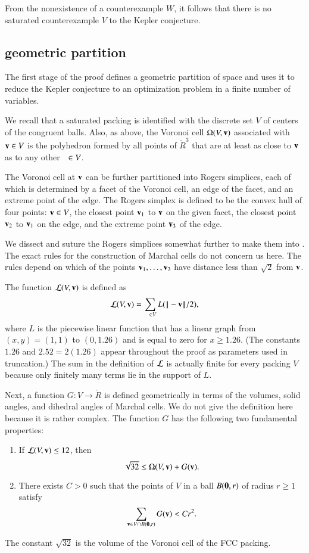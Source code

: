 From the nonexistence of a counterexample $W$, 
it follows that there is no saturated
counterexample $V$ to the Kepler conjecture.



\subsection{geometric partition}

The first stage of the proof defines a geometric partition of space
and uses it to reduce the Kepler conjecture to an optimization problem
in a finite number of variables.

We recall that a saturated packing is
identified with the discrete set $V$ of centers of the
congruent balls.  Also, as above, the Voronoi cell $\Omega(V,{\mathbf v})$
associated with ${\mathbf v}\in V$ is the polyhedron formed by all points of
$\ring{R}^3$ that are at least as close to ${\mathbf v}$ as to any other $\hskip0.65em\in
V$.   

The Voronoi cell at ${\mathbf v}$ can be further partitioned into Rogers
simplices, each of which is determined by a facet of the Voronoi cell, an edge of
the facet, and an extreme point of the edge.  The Rogers simplex is defined to be the
convex hull of four points: ${\mathbf v}\in V$, the closest point ${\mathbf v}_1$ to ${\mathbf v}$ on the given facet, the closest point ${\mathbf v}_2$ to ${\mathbf v}_1$ on the edge, and the
extreme point ${\mathbf v}_3$ of the edge.


We dissect and suture the Rogers simplices somewhat further to make them into 
.  The exact rules for the construction of Marchal cells
do not concern us here.  The rules depend on which of the
points ${\mathbf v}_1,\ldots,{\mathbf v}_3$ have distance  less than $\sqrt2$ from
${\mathbf v}$.

The function
 ${\mathcal L}(V,{\mathbf v})$ is defined as
\begin{equation}\label{eqn:LV}
\CalL(V,\v) = \sum_{\w\in V} L(\norm{\w}{\v}/2),
\end{equation}
where $L$ is the piecewise linear function that has a linear graph from
$(x,y)=(1,1)$ to $(0,1.26)$ and is equal to zero for $x\ge 1.26$.  (The
constants $1.26$ and $2.52=2(1.26)$ appear throughout the proof as
parameters used in truncation.)   
The sum in the definition of ${\mathcal L}$ is actually finite for every packing $V$ because only finitely many terms
lie in the support of $L$. 

Next, a function $G:V\to \ring{R}$ is defined geometrically in terms
of the volumes, solid angles, and dihedral angles of Marchal cells.
We do not give the definition here because it is rather
complex.  The function $G$ has the following two fundamental
properties:
\begin{enumerate}
\item If ${\mathcal L}(V,{\mathbf v})\le 12$, then 
\[
\sqrt{32}\le \Omega(V,{\mathbf v}) +G({\mathbf v}).
\]
\item There exists $C>0$ such that the points of $V$ in a ball $B({\mathbf 0},r)$
of radius $r\ge 1$ satisfy
\[
\sum_{{\mathbf v}\in V \cap B({\mathbf 0},r)} G({\mathbf v}) < C r^2.
\]
\end{enumerate}
The constant $\sqrt{32}$ is the volume of the Voronoi cell of the FCC packing.

